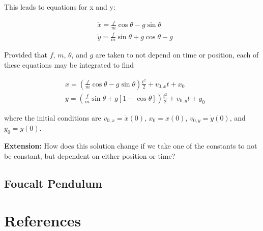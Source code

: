 \documentclass[main.tex]{subfiles}
\begin{document}
\begin{appendices}
This leads to equations for x and y:

\begin{align*}
&\ddot{x} = \frac{f}{m} \cos \theta - g \sin \theta \\
&\ddot{y} = \frac{f}{m} \sin \theta + g \cos \theta - g
\end{align*}

Provided that $f$, $m$, $\theta$, and $g$ are taken to not depend on time or position,
each of these equations may be integrated to find

\begin{align*}
& x = \left( \frac{f}{m} \cos \theta - g \sin \theta \right) \frac{t^2}{2} + v_{0,x} t
+ x_0 \\
& y = \left( \frac{f}{m} \sin \theta + g \left[ 1 - \cos \theta \right] \right) \frac{t^2}{2}
+ v_{0,y} t + y_0
\end{align*}

where the initial conditions are $v_{0,x} = \dot{x}(0)$, $x_0 = x(0)$, $v_{0,y} =
\dot{y}(0)$, and $y_0 = y(0)$.

\textbf{Extension:} How does this solution change if we take one of the constants to not be constant, but
dependent on either position or time?


\section{Foucalt Pendulum}

\chapter{References}

\end{appendices}



\end{document}
